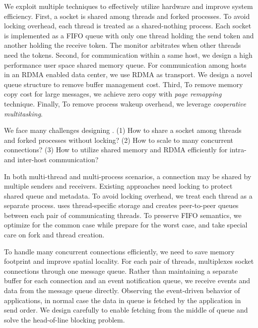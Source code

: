 
We exploit multiple techniques to effectively utilize hardware and improve system efficiency.
First, a socket is shared among threads and forked processes.
To avoid locking overhead, each thread is treated as a shared-nothing process.
Each socket is implemented as a FIFO queue with only one thread holding the send token and another holding the receive token.
The monitor arbitrates when other threads need the tokens.
Second, for communication within a same host, we design a high performance user space shared memory queue.
For communication among hosts in an RDMA enabled data center, we use RDMA as transport.
We design a novel queue structure to remove buffer management cost.
Third, To remove memory copy cost for large messages, we achieve zero copy with \emph{page remapping} technique.
Finally, To remove process wakeup overhead, we leverage \emph{cooperative multitasking}.

\iffalse

We face many challenges designing \sys{}. 
(1) How to share a socket among threads and forked processes without locking?
(2) How to scale to many concurrent connections?
(3) How to utilize shared memory and RDMA efficiently for intra- and inter-host communication?

In both multi-thread and multi-process scenarios, a connection may be shared by multiple senders and receivers.
Existing approaches need locking to protect shared queue and metadata.
To avoid locking overhead, we treat each thread as a separate process.
\libipc{} uses thread-specific storage and creates peer-to-peer queues between each pair of communicating threads.
To preserve FIFO semantics, we optimize for the common case while prepare for the worst case, and take special care on fork and thread creation.

To handle many concurrent connections efficiently, we need to save memory footprint and improve spatial locality.
For each pair of threads, \sys multiplexes socket connections through one message queue.
Rather than maintaining a separate buffer for each connection and an event notification queue, we receive events and data from the message queue directly.
Observing the event-driven behavior of applications, in normal case the data in queue is fetched by the application in send order.
We design carefully to enable fetching from the middle of queue and solve the head-of-line blocking problem.

